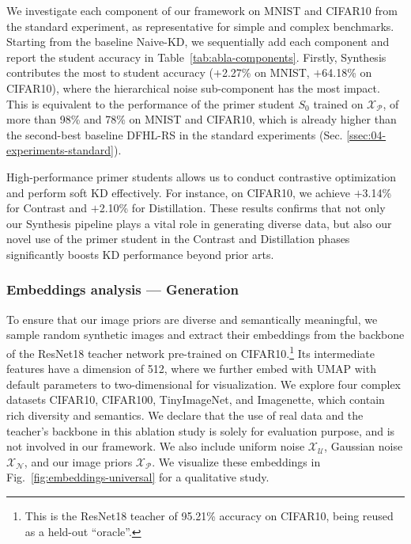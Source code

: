\begin{foldable}
    We investigate each component of our framework {\methodname} on MNIST and CIFAR10 from the standard experiment, as representative for simple and complex benchmarks.
    Starting from the baseline Naive-KD, we sequentially add each component and report the student accuracy in Table~\ref{tab:abla-components}.
    Firstly, Synthesis contributes the most to student accuracy ($+$2.27\% on MNIST, $+$64.18\% on CIFAR10), where the hierarchical noise sub-component has the most impact.
    This is equivalent to the performance of the primer student $S_0$ trained on $\mathcal{X}_\mathcal{P}$, of more than 98\% and 78\% on MNIST and CIFAR10, which is already higher than the second-best baseline DFHL-RS in the standard experiments (Sec. \ref{ssec:04-experiments-standard}).

    High-performance primer students allows us to conduct contrastive optimization and perform soft KD effectively.
    For instance, on CIFAR10, we achieve $+$3.14\% for Contrast and $+$2.10\% for Distillation.
    These results confirms that not only our Synthesis pipeline plays a vital role in generating diverse data, but also our novel use of the primer student in the Contrast and Distillation phases significantly boosts KD performance beyond prior arts.
\end{foldable}



\subsubsection{Embeddings analysis --- Generation} \label{sssec:04-experiments-ablation-embeddings-generation}
\begin{foldable}
    To ensure that our image priors are diverse and semantically meaningful, we sample random synthetic images and extract their embeddings from the backbone of the ResNet18 teacher network pre-trained on CIFAR10.\footnote{This is the ResNet18 teacher of 95.21\% accuracy on CIFAR10, being reused as a held-out ``oracle''.}
    Its intermediate features have a dimension of 512, where we further embed with UMAP \citep{mcinnes2018umap} with default parameters to two-dimensional for visualization.
    We explore four complex datasets CIFAR10, CIFAR100, TinyImageNet, and Imagenette, which contain rich diversity and semantics.
    We declare that the use of real data and the teacher's backbone in this ablation study is solely for evaluation purpose, and is not involved in our framework.
    We also include uniform noise $\mathcal{X}_{\mathcal{U}}$, Gaussian noise $\mathcal{X}_{\mathcal{N}}$, and our image priors $\mathcal{X}_{\mathcal{P}}$.
    We visualize these embeddings in Fig.~\ref{fig:embeddings-universal} for a qualitative study.
\end{foldable}

